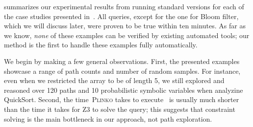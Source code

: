 \documentclass[acmsmall,review,anonymous]{acmart}\settopmatter{printfolios=true,printccs=false,printacmref=false}
\newcommand{\SYSTEM}{\textsc{Plinko}\xspace}
\begin{document}
\begin{table}
\begin{tabular}{@{}llllllll@{}}
    \bottomrule
  \end{tabular}
\end{table}
 summarizes our experimental results from running standard versions for each of the case studies presented in~.
% 
All queries, except for the one for Bloom filter, which we will discuss later, were proven to be true within ten minutes.
%
As far as we know, \emph{none} of these examples can be verified by existing
automated tools; our method is the first to handle these examples fully
automatically.

We begin by making a few general observations.
% 
First, the presented examples showcase a range of path counts and number of random samples.
% 
For instance, even when we restricted the array to be of length 5, we still explored and reasoned over 120 paths and 10 probabilistic symbolic variables when analyzine QuickSort.
% 
Second, the time~\SYSTEM takes to execute~ is usually much shorter than the time it takes for Z3 to solve the query; this suggests that constraint solving is the main bottleneck in our approach, not path exploration.
\end{document}
